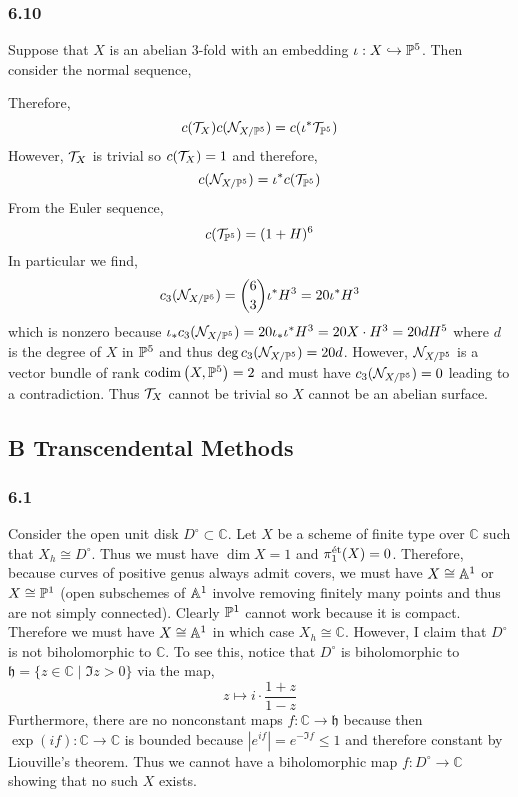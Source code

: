 \documentclass[12pt]{article}
\begin{document}
\subsubsection{6.10}

Suppose that $X$ is an abelian $3$-fold with an embedding $\iota : X \embed \P^5$. Then consider the normal sequence,
\begin{center}
\end{center}
Therefore,
\[ c(\T_X ) c(\sN_{X/\P^5}) = c(\iota^* \T_{\P^5}) \]
However, $\T_X$ is trivial so $c(\T_X) = 1$ and therefore,
\[ c(\sN_{X/\P^5}) = \iota^* c(\T_{\P^5}) \]
From the Euler sequence,
\[ c(\T_{\P^5}) = (1 + H)^6 \]
In particular we find,
\[ c_3(\sN_{X/\P^5}) = {6 \choose 3 } \iota^* H^3 = 20 \iota^* H^3 \]
which is nonzero because $\iota_* c_3(\sN_{X/\P^5}) = 20 \iota_* \iota^* H^3 = 20 X \cdot H^3 = 20 d H^5$ where $d$ is the degree of $X$ in $\P^5$ and thus $\deg{c_3(\sN_{X/\P^5})} = 20 d$. However, $\sN_{X/\P^5}$ is a vector bundle of rank $\codim{X, \P^5} = 2$ and must have $c_3(\sN_{X/\P^5}) = 0$ leading to a contradiction. Thus $\T_X$ cannot be trivial so $X$ cannot be an abelian surface.

\subsection{B Transcendental Methods}

\newcommand{\h}{\mathfrak{h}}
\renewcommand{\C}{\mathbb{C}}

\subsubsection{6.1}


Consider the open unit disk $D^\circ \subset \C$. Let $X$ be a scheme of finite type over $\C$ such that $X_h \cong D^\circ$. Thus we must have $\dim{X} = 1$ and $\pi_1^{\et}(X) = 0$. Therefore, because curves of positive genus always admit \etale covers, we must have $X \cong \A^1$ or $X \cong \P^1$ (open subschemes of $\A^1$ involve removing finitely many points and thus are not simply connected). Clearly $\P^1$ cannot work because it is compact. Therefore we must have $X \cong \A^1$ in which case $X_h \cong \C$. However, I claim that $D^\circ$ is not biholomorphic to $\C$. To see this, notice that $D^\circ$ is biholomorphic to $\h = \{ z \in \C \mid \Im{z} > 0 \}$ via the map,
\[ z \mapsto i \cdot \frac{1 + z}{1 - z} \] 
Furthermore, there are no nonconstant maps $f : \C \to \h$ because then $\exp{(if)} : \C \to \C$ is bounded because $|e^{if}| = e^{- \Im{f}} \le 1$ and therefore constant by Liouville's theorem. Thus we cannot have a biholomorphic map $f : D^\circ \to \C$ showing that no such $X$ exists. 
\end{document}
